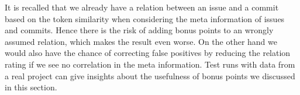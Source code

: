 It is recalled that we already have a relation between an issue and a commit based on the token similarity when considering the meta information of issues and commits.
Hence there is the risk of adding bonus points to an wrongly assumed relation, which makes the result even worse.
On the other hand we would also have the chance of correcting false positives by reducing the relation rating if we see no correlation in the meta information.
Test runs with data from a real project can give insights about the usefulness of bonus points we discussed in this section.